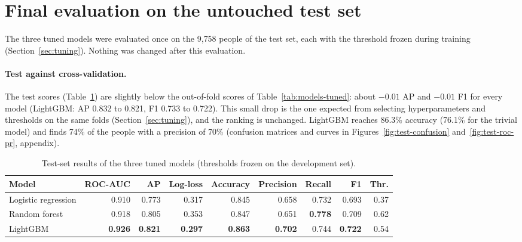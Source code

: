 \section{Final evaluation on the untouched test set}
\label{sec:test}

The three tuned models were evaluated once on the 9{,}758 people of the test
set, each with the threshold frozen during training
(Section~\ref{sec:tuning}). Nothing was changed after this evaluation.

\paragraph{Test against cross-validation.} The test scores
(Table~\ref{tab:test}) are slightly below the out-of-fold scores of
Table~\ref{tab:models-tuned}: about $-0.01$ AP and $-0.01$ F1 for every model
(LightGBM: AP 0.832 to 0.821, F1 0.733 to 0.722). This small drop is the one
expected from selecting hyperparameters and thresholds on the same folds
(Section~\ref{sec:tuning}), and the ranking is unchanged. LightGBM reaches
86.3\% accuracy (76.1\% for the trivial model) and finds 74\% of the \pos{}
people with a precision of 70\% (confusion matrices and curves in
Figures~\ref{fig:test-confusion} and~\ref{fig:test-roc-pr}, appendix).

\begin{table}[H]
\centering
\caption{Test-set results of the three tuned models (thresholds frozen on
the development set).}
\label{tab:test}
\small
\setlength{\tabcolsep}{4pt}
\begin{tabular}{lrrrrrrrr}
\toprule
Model & ROC-AUC & AP & Log-loss & Accuracy & Precision & Recall & F1 & Thr. \\
\midrule
Logistic regression & 0.910 & 0.773 & 0.317 & 0.845 & 0.658 & 0.732 & 0.693 & 0.37 \\
Random forest       & 0.918 & 0.805 & 0.353 & 0.847 & 0.651 & \textbf{0.778} & 0.709 & 0.62 \\
LightGBM            & \textbf{0.926} & \textbf{0.821} & \textbf{0.297} & \textbf{0.863} & \textbf{0.702} & 0.744 & \textbf{0.722} & 0.54 \\
\bottomrule
\end{tabular}
\end{table}
